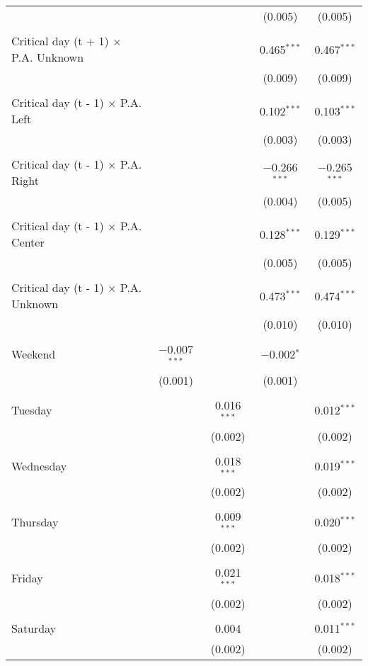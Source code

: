 \documentclass[
]{article}
\begin{document}
\begin{table}[!htbp]
{\begin{tabular}{@{\extracolsep{5pt}}lcccc}
  &  &  & (0.005) & (0.005) \\ 
  & & & & \\ 
 Critical day (t + 1) $\times$ P.A. Unknown &  &  & 0.465$^{***}$ & 0.467$^{***}$ \\ 
  &  &  & (0.009) & (0.009) \\ 
  & & & & \\ 
 Critical day (t - 1) $\times$ P.A. Left &  &  & 0.102$^{***}$ & 0.103$^{***}$ \\ 
  &  &  & (0.003) & (0.003) \\ 
  & & & & \\ 
 Critical day (t - 1) $\times$ P.A. Right &  &  & $-$0.266$^{***}$ & $-$0.265$^{***}$ \\ 
  &  &  & (0.004) & (0.005) \\ 
  & & & & \\ 
 Critical day (t - 1) $\times$ P.A. Center &  &  & 0.128$^{***}$ & 0.129$^{***}$ \\ 
  &  &  & (0.005) & (0.005) \\ 
  & & & & \\ 
 Critical day (t - 1) $\times$ P.A. Unknown &  &  & 0.473$^{***}$ & 0.474$^{***}$ \\ 
  &  &  & (0.010) & (0.010) \\ 
  & & & & \\ 
 Weekend & $-$0.007$^{***}$ &  & $-$0.002$^{*}$ &  \\ 
  & (0.001) &  & (0.001) &  \\ 
  & & & & \\ 
 Tuesday &  & 0.016$^{***}$ &  & 0.012$^{***}$ \\ 
  &  & (0.002) &  & (0.002) \\ 
  & & & & \\ 
 Wednesday &  & 0.018$^{***}$ &  & 0.019$^{***}$ \\ 
  &  & (0.002) &  & (0.002) \\ 
  & & & & \\ 
 Thursday &  & 0.009$^{***}$ &  & 0.020$^{***}$ \\ 
  &  & (0.002) &  & (0.002) \\ 
  & & & & \\ 
 Friday &  & 0.021$^{***}$ &  & 0.018$^{***}$ \\ 
  &  & (0.002) &  & (0.002) \\ 
  & & & & \\ 
 Saturday &  & 0.004 &  & 0.011$^{***}$ \\ 
  &  & (0.002) &  & (0.002) \\ 

\end{tabular}}
\end{table}
\end{document}
